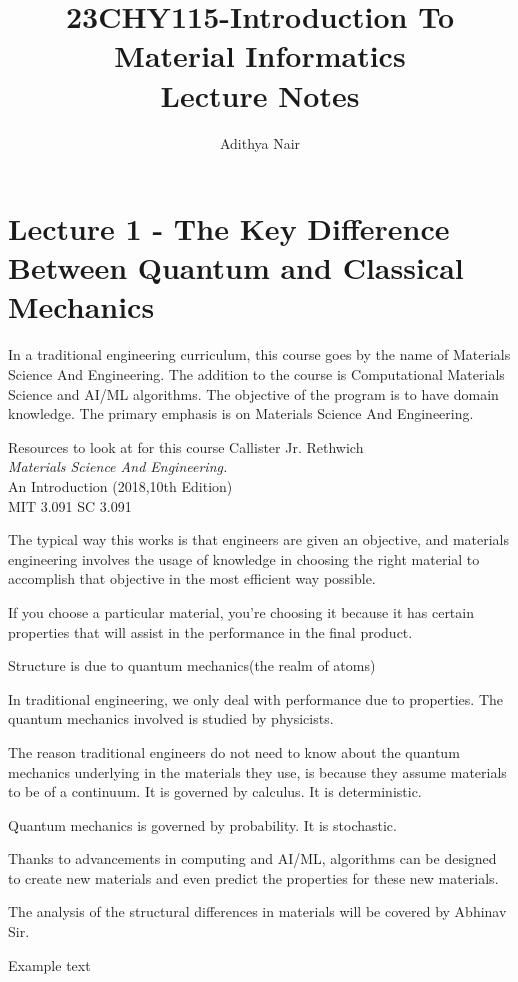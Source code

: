 \documentclass{report}
\title{\Huge{23CHY115-Introduction To Material Informatics}\\Lecture Notes}
\author{\huge{Adithya Nair}}
\date{}
\begin{document}
\maketitle
\newpage%
\chapter{Lecture 1 - The Key Difference Between Quantum and Classical Mechanics} %
In a traditional engineering curriculum, this course goes by the name of Materials Science And Engineering. The addition to the course is Computational Materials Science and AI/ML algorithms. The objective of the program is to have domain knowledge. The primary emphasis is on Materials Science And Engineering.
\begin{Reference}{Resources to look at for this course}
 Callister Jr. Rethwich \\
\textit{Materials Science And Engineering.}  \\
An Introduction (2018,10th Edition) \\
MIT 3.091 SC
3.091
\end{Reference}
The typical way this works is that engineers are given an objective, and materials engineering involves the usage of knowledge in choosing the right material to accomplish that objective in the most efficient way possible.

If you choose a particular material, you're choosing it because it has certain properties that will assist in the performance in the final product.


Structure is due to quantum mechanics(the realm of atoms)

In traditional engineering, we only deal with performance due to properties. The quantum mechanics involved is studied by physicists.

The reason traditional engineers do not need to know about the quantum mechanics underlying in the materials they use, is because they assume materials to be of a continuum. It is governed by calculus. It is deterministic.

Quantum mechanics is governed by probability. It is stochastic.

Thanks to advancements in computing and AI/ML, algorithms can be designed to create new materials and even predict the properties for these new materials.

The analysis of the structural differences in materials will be covered by Abhinav Sir.

Example text

\end{document}
